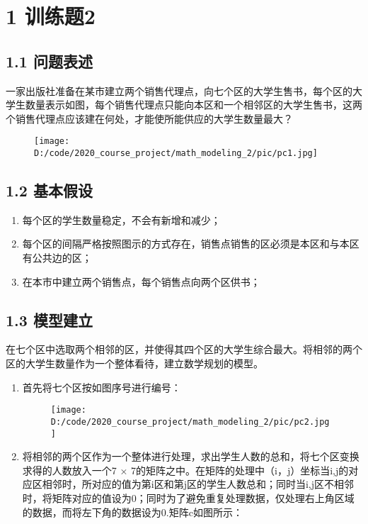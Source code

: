 \documentclass[bachelor,openany,oneside,color]{buaathesis}
\begin{document}
\hypertarget{header-n14}{%
\chapter{1 训练题2}\label{header-n14}}
\setcounter{table}{0}\setcounter{figure}{0}
\hypertarget{header-n15}{%
\section{1.1 问题表述}\label{header-n15}}

一家出版社准备在某市建立两个销售代理点，向七个区的大学生售书，每个区的大学生数量表示如图，每个销售代理点只能向本区和一个相邻区的大学生售书，这两个销售代理点应该建在何处，才能使所能供应的大学生数量最大？

\begin{figure}
\centering
\texttt{[image: D:/code/2020\_course\_project/math\_modeling\_2/pic/pc1.jpg]}
\caption{}
\end{figure}

\hypertarget{header-n18}{%
\section{1.2 基本假设}\label{header-n18}}

\begin{enumerate}
\def\labelenumi{\arabic{enumi}.}
\item
  每个区的学生数量稳定，不会有新增和减少；
\item
  每个区的间隔严格按照图示的方式存在，销售点销售的区必须是本区和与本区有公共边的区；
\item
  在本市中建立两个销售点，每个销售点向两个区供书；
\end{enumerate}

\hypertarget{header-n26}{%
\section{1.3 模型建立}\label{header-n26}}

在七个区中选取两个相邻的区，并使得其四个区的大学生综合最大。将相邻的两个区的大学生数量作为一个整体看待，建立数学规划的模型。

\begin{enumerate}
\def\labelenumi{\arabic{enumi}.}
\item
  首先将七个区按如图序号进行编号：

  \begin{figure}
  \centering
  \texttt{[image: D:/code/2020\_course\_project/math\_modeling\_2/pic/pc2.jpg]}
  \caption{}
  \end{figure}
\item
  将相邻的两个区作为一个整体进行处理，求出学生人数的总和，将七个区变换求得的人数放入一个7
  ×
  7的矩阵之中。在矩阵的处理中（i，j）坐标当i,j的对应区相邻时，所对应的值为第i区和第j区的学生人数总和；同时当i,j区不相邻时，将矩阵对应的值设为0；同时为了避免重复处理数据，仅处理右上角区域的数据，而将左下角的数据设为0.矩阵c如图所示：
\end{enumerate}
\end{document}
